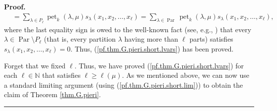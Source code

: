 \documentclass[numbers=enddot,12pt,final,onecolumn,notitlepage]{scrartcl}%
\theoremstyle{definition}
\newenvironment{proof}[1][Proof]{\noindent\textbf{#1.} }{\ \rule{0.5em}{0.5em}}
\let\sumnonlimits\sum
\renewcommand{\sum}{\sumnonlimits\limits}
\newenvironment{vershort}{}{}
\begin{document}
\begin{vershort}
\begin{proof}
\begin{align*}
&  =\sum_{\lambda\in P_{\ell}}\operatorname*{pet}\nolimits_{k}\left(
\lambda,\mu\right)  s_{\lambda}\left(  x_{1},x_{2},\ldots,x_{\ell}\right)
=\sum_{\lambda\in\operatorname*{Par}}\operatorname*{pet}\nolimits_{k}\left(
\lambda,\mu\right)  s_{\lambda}\left(  x_{1},x_{2},\ldots,x_{\ell}\right)  ,
\end{align*}
where the last equality sign is owed to the well-known fact (see, e.g.,
\cite[Exercise 2.3.8(b)]{GriRei}) that every $\lambda\in\operatorname*{Par}%
\setminus P_{\ell}$ (that is, every partition $\lambda$ having more than
$\ell$ parts) satisfies $s_{\lambda}\left(  x_{1},x_{2},\ldots,x_{\ell
}\right)  =0$. Thus, (\ref{pf.thm.G.pieri.short.lvars}) has been proved.

Forget that we fixed $\ell$. Thus, we have proved
(\ref{pf.thm.G.pieri.short.lvars}) for each $\ell\in\mathbb{N}$ that satisfies
$\ell\geq\ell\left(  \mu\right)  $. As we mentioned above, we can now use a
standard limiting argument (using (\ref{pf.thm.G.pieri.short.lim})) to obtain
the claim of Theorem \ref{thm.G.pieri}.
\end{proof}
\end{vershort}
\end{document}
